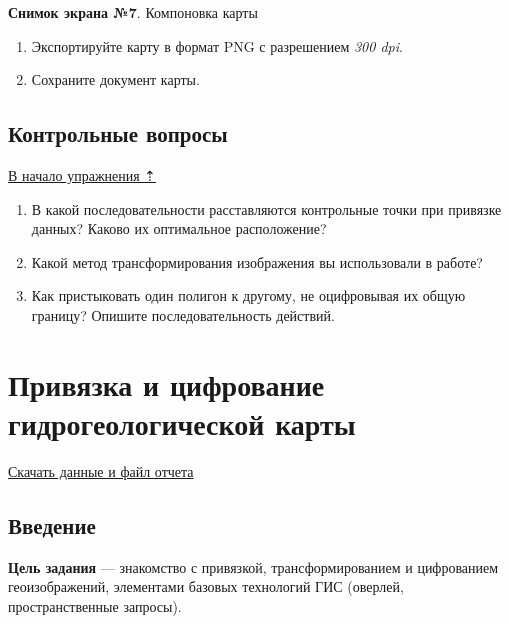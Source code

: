 \documentclass[]{book}
\theoremstyle{definition}
\theoremstyle{definition}
\theoremstyle{definition}
\theoremstyle{remark}
\begin{document}
\textbf{Снимок экрана №7}. Компоновка карты

\begin{enumerate}
\def\labelenumi{\arabic{enumi}.}
\item
  Экспортируйте карту в формат PNG с разрешением \emph{300 dpi}.
\item
  Сохраните документ карты.
\end{enumerate}

\hypertarget{map-ref-general-questions}{%
\section{Контрольные вопросы}\label{map-ref-general-questions}}

\protect\hyperlink{map-ref-general}{В начало упражнения ⇡}

\begin{enumerate}
\def\labelenumi{\arabic{enumi}.}
\item
  В какой последовательности расставляются контрольные точки при
  привязке данных? Каково их оптимальное расположение?
\item
  Какой метод трансформирования изображения вы использовали в работе?
\item
  Как пристыковать один полигон к другому, не оцифровывая их общую
  границу? Опишите последовательность действий.
\end{enumerate}

\hypertarget{map-ref-hydrogeologic}{%
\chapter{Привязка и цифрование гидрогеологической
карты}\label{map-ref-hydrogeologic}}

\href{http://autolab.geogr.msu.ru/gis/data/Ex06.zip}{Скачать данные и
файл отчета}

\hypertarget{map-ref-hydrogeologic-intro}{%
\section{Введение}\label{map-ref-hydrogeologic-intro}}

\textbf{Цель задания} --- знакомство с привязкой, трансформированием и
цифрованием геоизображений, элементами базовых технологий ГИС (оверлей,
пространственные запросы).
\end{document}
